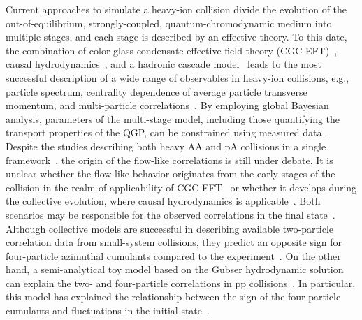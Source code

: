 Current approaches to simulate a heavy-ion collision divide the evolution of the out-of-equilibrium, strongly-coupled, quantum-chromodynamic medium into multiple stages, and each stage is described by an effective theory.  To this date, the combination of color-glass condensate effective field theory (CGC-EFT)~\cite{Schenke:2012wb,Schenke:2012hg}, causal hydrodynamics~\cite{Kolb:2003dz,Song:2007ux,Dusling:2007gi,Holopainen:2010gz,Schenke:2010rr,Romatschke:2007mq,Niemi:2015qia,Jeon:2015dfa,Romatschke:2017ejr}, and a hadronic cascade model~\cite{Bass:1998ca,Bleicher:1999xi,Weil:2016zrk} leads to the most successful description of a wide range of observables in heavy-ion collisions, e.g., particle spectrum, centrality dependence of average particle transverse momentum, and multi-particle correlations~\cite{ALICE:2016kpq,Acharya:2017gsw,Acharya:2017zfg,Acharya:2020taj,ALICE:2021klf,ALICE:2021adw,ALICE:2013mez,ALICE:2011ab}. 
By employing global Bayesian analysis, parameters of the multi-stage model, including those quantifying the transport properties of the QGP, can be constrained using measured data~\cite{Bernhard:2016tnd,Bernhard:2019bmu,Parkkila:2021tqq,Parkkila:2021yha}.
Despite the studies describing both heavy AA and pA collisions in a single framework~\cite{Moreland:2018gsh}, the origin of the flow-like correlations is still under debate. It is unclear whether the flow-like behavior originates from the early stages of the collision in the realm of applicability of CGC-EFT~\cite{Dusling:2012cg,Bzdak:2013zma} or whether it develops during the collective evolution, where causal hydrodynamics is applicable~\cite{Greif:2017bnr,Mantysaari:2017cni}. Both scenarios may be responsible for the observed correlations in the final state~\cite{Greif:2017bnr}. Although collective models are successful in describing available two-particle correlation data from small-system collisions, they predict an opposite sign for four-particle azimuthal cumulants compared to the experiment~\cite{Khachatryan:2016txc,ATLAS:2017rtr,Zhao:2017rgg}. On the other hand, a semi-analytical toy model based on the Gubser hydrodynamic solution~\cite{Gubser:2010ze,Gubser:2010ui} can explain the two- and four-particle correlations in pp collisions~\cite{Taghavi:2019mqz}. In particular, this model has explained the relationship between the sign of the four-particle cumulants and fluctuations in the initial state~\cite{Taghavi:2019mqz}. 


